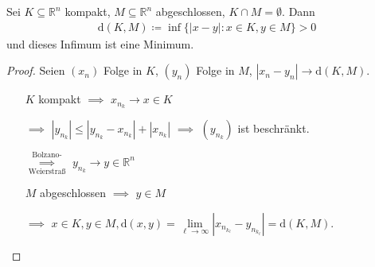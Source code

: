 \begin{theorem}[Satz] \label{thm:10.3}
  Sei $K \subseteq \mathbb{R}^n$ kompakt, $M \subseteq \mathbb{R}^n$ abgeschlossen, $K \cap M = \emptyset$. Dann
  \begin{align*}
    \mathrm{d}(K,M) \coloneq \inf \{ |x-y| : x \in K, y \in M \} > 0
  \end{align*}
  und dieses Infimum ist eine Minimum.
  
  \begin{proof}
    Seien $(x_n)$ Folge in $K$, $(y_n)$ Folge in $M$, $|x_n-y_n| \to \mathrm{d}(K,M)$.
    \begin{itemize}
      \item[] $K$ kompakt $\implies$ $x_{n_k} \to x \in K$
      
      \item[$\implies$] $|y_{n_k}| \leq |y_{n_k} - x_{n_k}| + |x_{n_k}|$ $\implies$ $(y_{n_k})$ ist beschränkt.
      
      \item[$\overset{\text{Bolzano-}}{\underset{\text{Weierstraß}}{\implies}}$] $y_{n_k} \to y \in \mathbb{R}^n$
      
      \item[] $M$ abgeschlossen $\implies$ $y \in M$
      
      \item[$\implies$] $x \in K , y \in M, \mathrm{d}(x,y) = \lim\limits_{\ell \to \infty}|x_{n_{k_\ell}} - y_{n_{k_\ell}}| = \mathrm{d}(K,M)$.
    \end{itemize}
  \end{proof}
\end{theorem}

